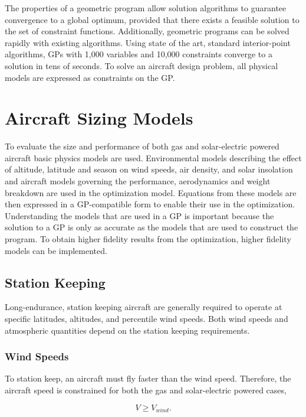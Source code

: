 \documentclass[]{aiaa-tc}%
\begin{document}
The properties of a geometric program allow solution algorithms to guarantee convergence to a global optimum, provided that there exists a feasible solution to the set of constraint functions.  
Additionally, geometric programs can be solved rapidly with existing algorithms.  
Using state of the art, standard interior-point algorithms, GPs with 1,000 variables and 10,000 constraints converge to a solution in tens of seconds.\cite{gp}  
To solve an aircraft design problem, all physical models are expressed as constraints on the GP.\cite{hoburgthesis} \\

\section{Aircraft Sizing Models}

To evaluate the size and performance of both gas and solar-electric powered aircraft basic physics models are used.  
Environmental models describing the effect of altitude, latitude and season on wind speeds, air density, and solar insolation and aircraft models governing the performance, aerodynamics and weight breakdown are used in the optimization model.
Equations from these models are then expressed in a GP-compatible form to enable their use in the optimization. 
Understanding the models that are used in a GP is important because the solution to a GP is only as accurate as the models that are used to construct the program.  
To obtain higher fidelity results from the optimization, higher fidelity models can be implemented. 

\subsection{Station Keeping}

Long-endurance, station keeping aircraft are generally required to operate at specific latitudes, altitudes, and percentile wind speeds. Both wind speeds and atmospheric quantities depend on the station keeping requirements. 

\subsubsection{Wind Speeds}

To station keep, an aircraft must fly faster than the wind speed.  
Therefore, the aircraft speed is constrained for both the gas and solar-electric powered cases,

\begin{equation}
    \label{e:availreq}
    V \geq V_{wind}.
\end{equation}
\end{document}
